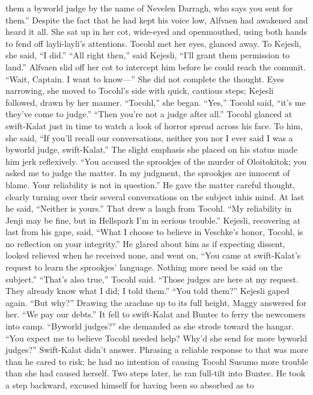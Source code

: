 \documentclass[9pt]{article}
\begin{document}
them a byworld judge by the name of Nevelen Darragh, who says you sent for them.”
Despite the fact that he had kept his voice low, Alfvaen had awakened and heard it all. She sat up in
her cot, wide-eyed and openmouthed, using both hands to fend off layli-layli’s attentions.
Tocohl met her eyes, glanced away. To Kejesli, she said, “I did.”
“All right then,” said Kejesli, “I’ll grant them permission to land.”
Alfvaen slid off her cot to intercept him before he could reach the comunit. “Wait, Captain. I want to
know—” She did not complete the thought. Eyes narrowing, she moved to Tocohl’s side with quick,
cautious steps; Kejesli followed, drawn by her manner. “Tocohl,” she began.
“Yes,” Tocohl said, “it’s me they’ve come to judge.”
“Then you’re not a judge after all.”
Tocohl glanced at swift-Kalat just in time to watch a look of horror spread across his face. To him,
she said, “If you’ll recall our conversations, neither you nor I ever said I was a byworld judge,
swift-Kalat.” The slight emphasis she placed on his status made him jerk reflexively. “You accused the
sprookjes of the murder of Oloitokitok; you asked me to judge the matter. In my judgment, the
sprookjes are innocent of blame. Your reliability is not in question.”
He gave the matter careful thought, clearly turning over their several conversations on the subject inhis mind. At last he said, “Neither is yours.”
That drew a laugh from Tocohl. “My reliability in Jenji may be fine, but in Hellspark I’m in serious
trouble.”
Kejesli, recovering at last from his gape, said, “What I choose to believe in Veschke’s honor,
Tocohl, is no reflection on your integrity.” He glared about him as if expecting dissent, looked relieved
when he received none, and went on, “You came at swift-Kalat’s request to learn the sprookjes’
language. Nothing more need be said on the subject.”
“That’s also true,” Tocohl said. “Those judges are here at my request. They already know what I
did; I told them.”
“You told them?” Kejesli gaped again. “But why?”
Drawing the arachne up to its full height, Maggy answered for her. “We pay our debts.”
It fell to swift-Kalat and Buntec to ferry the newcomers into camp. “Byworld judges?” she
demanded as she strode toward the hangar. “You expect me to believe Tocohl needed help? Why’d she
send for more byworld judges?”
Swift-Kalat didn’t answer. Phrasing a reliable response to that was more than he cared to risk; he
had no intention of causing Tocohl Susumo more trouble than she had caused herself. Two steps later, he
ran full-tilt into Buntec. He took a step backward, excused himself for having been so absorbed as to
\end{document}
